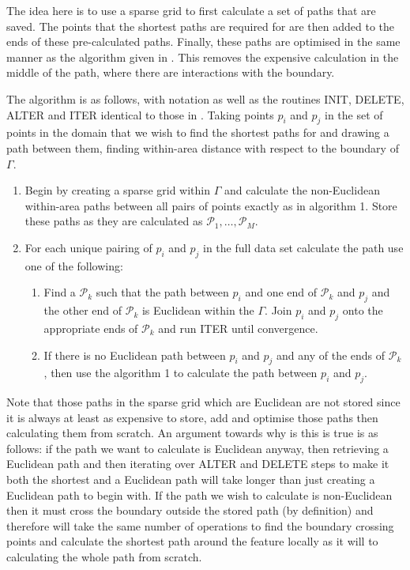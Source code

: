 The idea here is to use a sparse grid to first calculate a set of paths that are saved. The points that the shortest paths are required for are then added to the ends of these pre-calculated paths. Finally, these paths are optimised in the same manner as the algorithm given in . This removes the expensive calculation in the middle of the path, where there are interactions with the boundary.

The algorithm is as follows, with notation as well as the routines INIT, DELETE, ALTER and ITER identical to those in . Taking points $p_i$ and $p_j$ in the set of points in the domain that we wish to find the shortest paths for and drawing a path between them, finding within-area distance with respect to the boundary of $\Gamma$.

\begin{enumerate}
 \item Begin by creating a sparse grid within $\Gamma$ and calculate the non-Euclidean within-area paths between all pairs of points exactly as in algorithm 1. Store these paths as they are calculated as $\mathcal{P}_1,\ldots, \mathcal{P}_M$.
\item For each unique pairing of $p_i$ and $p_j$ in the full data set calculate the path use one of the following:
	\begin{enumerate}
	\item Find a $\mathcal{P}_k$ such that the path between $p_i$ and one end of $\mathcal{P}_k$ and $p_j$ and the other end of $\mathcal{P}_k$ is Euclidean within the $\Gamma$. Join $p_i$ and $p_j$ onto the appropriate ends of $\mathcal{P}_k$ and run ITER until convergence.
	\item If there is no Euclidean path between $p_i$ and $p_j$ and any of the ends of $\mathcal{P}_k$, then use the algorithm 1 to calculate the path between $p_i$ and $p_j$. 
	\end{enumerate}
\end{enumerate}

Note that those paths in the sparse grid which are Euclidean are not stored since it is always at least as expensive to store, add and optimise those paths then calculating them from scratch. An argument towards why is this is true is as follows: if the path we want to calculate is Euclidean anyway, then retrieving a Euclidean path and then iterating over ALTER and DELETE steps to make it both the shortest and a Euclidean path will take longer than just creating a Euclidean path to begin with. If the path we wish to calculate is non-Euclidean then it must cross the boundary outside the stored path (by definition) and therefore will take the same number of operations to find the boundary crossing points and calculate the shortest path around the feature locally as it will to calculating the whole path from scratch.


